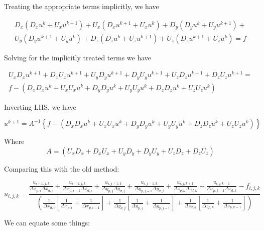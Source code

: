 \documentclass[11pt]{article}
\begin{document}
Treating the appropriate terms implicitly, we have

\begin{multline}
	D_x (D_x u^{ k } + U_x u^{k+1}) +
	U_x (D_x u^{k+1} + U_x u^{ k }) +
	D_y (D_y u^{ k } + U_y u^{k+1}) + \\
	U_y (D_y u^{k+1} + U_y u^{ k }) +
	D_z (D_z u^{ k } + U_z u^{k+1}) +
	U_z (D_z u^{k+1} + U_z u^{ k })
	= f
\end{multline}

Solving for the implicitly treated terms we have

\begin{multline}
	U_x D_x u^{k+1} + D_x U_x u^{k+1} +
	U_y D_y u^{k+1} + D_y U_y u^{k+1} +
	U_z D_z u^{k+1} + D_z U_z u^{k+1}
	=  \\
	f -
	(
	D_x D_x u^k +
	U_x U_x u^k +
	D_y D_y u^k +
	U_y U_y u^k +
	D_z D_z u^k +
	U_z U_z u^k
	)
\end{multline}

Inverting LHS, we have

\begin{equation}
	u^{k+1}
	= 
	A^{-1}
	\left\{
	f -
	(
	D_x D_x u^k +
	U_x U_x u^k +
	D_y D_y u^k +
	U_y U_y u^k +
	D_z D_z u^k +
	U_z U_z u^k
	)
	\right\}
\end{equation}

Where
\begin{equation}
	A
	= 
	(
	U_x D_x + D_x U_x +
	U_y D_y + D_y U_y +
	U_z D_z + D_z U_z
	)
\end{equation}


Comparing this with the old method:

\begin{equation}
	u_{i,j,k} = 
	\frac{ 
	\frac{u_{i+1,j,k}}{\Delta x_{p,i} \Delta x_{d,i}} + \frac{u_{i-1,j,k}}{\Delta x_{p,i-1} \Delta x_{d,i}} + 
	\frac{u_{i,j+1,k}}{\Delta y_{p,j} \Delta y_{d,j}} + \frac{u_{i,j-1,k}}{\Delta y_{p,j-1} \Delta y_{d,j}} +
	\frac{u_{i,j,k+1}}{\Delta z_{p,k} \Delta z_{d,k}} + \frac{u_{i,j,k-1}}{\Delta z_{p,k-1} \Delta z_{d,k}}
	- f_{i,j,k} }{
	\left( 
	\frac{ 1 }{ \Delta x_{d,i} }
	\left[
	\frac{ 1 }{ \Delta x_{p,i} } +
	\frac{ 1 }{ \Delta x_{p,i-1} }
	\right] +
	\frac{ 1 }{ \Delta y_{d,j} }
	\left[
	\frac{ 1 }{ \Delta y_{p,j} } +
	\frac{ 1 }{ \Delta y_{p,j-1} }
	\right] +
	\frac{ 1 }{ \Delta z_{d,k} }
	\left[
	\frac{ 1 }{ \Delta z_{p,k} } +
	\frac{ 1 }{ \Delta z_{p,k-1} }
	\right]
	\right)
	}
\end{equation}

We can equate some things:
\end{document}
